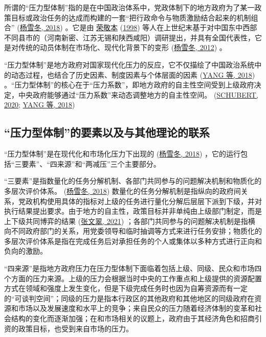 \documentclass[
  12pt,
]{ctexart}
\begin{document}
所谓的``压力型体制''指的是在中国政治体系中，党政体制下的地方政府为了某一政策目标或政治任务的达成而构建的一套``把行政命令与物质激励结合起来的机制组合'' (\protect\hyperlink{ref-YangXueDong2018}{杨雪冬, 2018}) 。它是由 \protect\hyperlink{ref-RongJingBen1998a}{荣敬本} (\protect\hyperlink{ref-RongJingBen1998a}{1998}) 等人在上世纪末基于对中国东中西部不同县市的（河南新密、江苏无锡和陕西咸阳）调研提出，并具有全国代表性，它是对传统的动员体制在市场化、现代化背景下的变形 (\protect\hyperlink{ref-YangXueDong2012}{杨雪冬, 2012}) 。

``压力型体制''是地方政府对国家现代化压力的反应，它不仅描绘了中国政治系统中的动态过程，也结合了历史因素、制度因素与个体层面的因素 (\protect\hyperlink{ref-YangYan2018}{YANG 等, 2018}) 。``压力型体制''的核心在于``压力系数''，即地方政府的自主性空间受到上级政府决定，中央政府能够通过``压力系数''来动态调整地方的自主性空间。 (\protect\hyperlink{ref-Schubert2020}{SCHUBERT, 2020}; \protect\hyperlink{ref-YangYan2018}{YANG 等, 2018})

\hypertarget{ux538bux529bux578bux4f53ux5236ux7684ux8981ux7d20ux4ee5ux53caux4e0eux5176ux4ed6ux7406ux8bbaux7684ux8054ux7cfb}{%
\subsection{``压力型体制''的要素以及与其他理论的联系}\label{ux538bux529bux578bux4f53ux5236ux7684ux8981ux7d20ux4ee5ux53caux4e0eux5176ux4ed6ux7406ux8bbaux7684ux8054ux7cfb}}

``压力型体制''是在现代化和市场化压力下出现的 (\protect\hyperlink{ref-YangXueDong2018}{杨雪冬, 2018}) ，它的运行包括``三要素''、``四来源''和``两减压''三个主要部分。

``三要素''是指数量化的任务分解机制、各部门共同参与的问题解决机制和物质化的多层次评价体系。 (\protect\hyperlink{ref-YangXueDong2018}{杨雪冬, 2018}) 数量化的任务分解机制是指纵向的政府间关系，党政机构使用具体的指标对上级的任务进行量化分解后层层下派到下级，并对执行结果提出要求。由于地方的自主性，政策目标并非单纯由上级部门制定，而是上下级共同博弈的结果 (\protect\hyperlink{ref-ZhangWenCui2021}{张文翠, 2021}) ；各部门共同参与的问题解决机制是指横向不同政府部门的关系，用党委领导和临时抽调等方式来进行任务安排；物质化的多层次评价体系是指在完成任务后对承担任务的个人或集体以多种方式进行正向和负向的激励。

``四来源''是指地方政府压力在压力型体制下面临着包括上级、同级、民众和市场四个方面的压力来源。上级的压力会根据当时中央的工作重点和上级提供的资源配置方式在领域和强度上发生变化，但是下级完成任务时也因为自筹资源而有一定的``可谈判空间''；同级的压力是指本行政区的其他政府和其他地区的同级政府在资源和市场以及发展速度和水平上的竞争；来自民众的压力随着经济体制的变革和社会结构的变化而逐渐加强；在和市场相关的议题上，政府由于其经济角色和招商引资的政策目标，也受到来自市场的压力。
\end{document}

